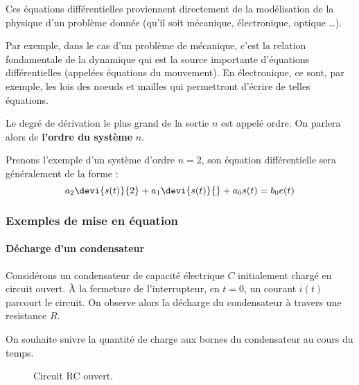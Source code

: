 Ces équations différentielles proviennent directement de la modélisation 
de la physique d'un problème donnée (qu'il soit mécanique, électronique, 
optique \ldots).

Par exemple, dans le cas d'un problème de mécanique, 
c'est la relation fondamentale de la dynamique qui est 
la source importante d'équations différentielles (appelées équations 
du mouvement).%
En électronique, ce sont, par exemple, les lois des noeuds et mailles qui 
permettront d'écrire de telles équations. 

Le degré de dérivation le plus grand de la sortie $n$ est appelé ordre. 
On parlera alors de \textbf{l'ordre du système} $n$.

Prenons l'exemple d'un système d'ordre $n=2$, son équation différentielle 
sera généralement de la forme :
$$
a_2\devi{s(t)}{2}+a_1\devi{s(t)}{}+a_0 s(t)=b_0e(t)
$$

\subsubsection{Exemples de mise en équation}

\paragraph{Décharge d'un condensateur}

Considérons un condensateur de capacité électrique $C$ 
initialement chargé en circuit ouvert.
À la fermeture de l'interrupteur, en $t=0$, 
un courant $i(t)$ parcourt le circuit.
On observe alors la décharge du condensateur à travers une resistance $R$. 

On souhaite suivre la quantité de charge aux bornes du condensateur au 
cours du temps.
\begin{figure}[!h]      
    \centering
    
    \caption{Circuit RC ouvert.\label{fig-decharge_condensateur}}
\end{figure}

